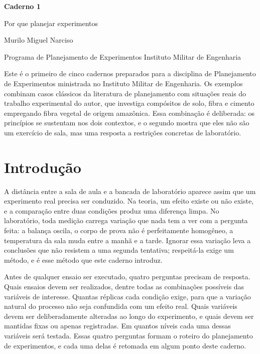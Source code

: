\documentclass{doeapostila}
\begin{document}
\begin{center}
  {\LARGE\bfseries Caderno 1}\par\smallskip
  {\Large Por que planejar experimentos}\par\smallskip
  {\normalsize Murilo Miguel Narciso}\par\smallskip
  {\footnotesize Programa de Planejamento de Experimentos \textbullet{} Instituto Militar de Engenharia}
\end{center}

\vspace{0.6\baselineskip}

\noindent
Este é o primeiro de cinco cadernos preparados para a disciplina de
Planejamento de Experimentos ministrada no Instituto Militar de Engenharia.
Os exemplos combinam casos clássicos da literatura de planejamento com
situações reais do trabalho experimental do autor, que investiga compósitos
de solo, fibra e cimento empregando fibra vegetal de origem amazônica. Essa
combinação é deliberada: os princípios se sustentam nos dois contextos, e o
segundo mostra que eles não são um exercício de sala, mas uma resposta a
restrições concretas de laboratório.

\vspace{0.6\baselineskip}

\tableofcontents

\section{Introdução}
\label{sec:introducao}

A distância entre a sala de aula e a bancada de laboratório aparece assim
que um experimento real precisa ser conduzido. Na teoria, um efeito existe
ou não existe, e a comparação entre duas condições produz uma diferença
limpa. No laboratório, toda medição carrega variação que nada tem a ver com
a pergunta feita: a balança oscila, o corpo de prova não é perfeitamente
homogêneo, a temperatura da sala muda entre a manhã e a tarde. Ignorar essa
variação leva a conclusões que não resistem a uma segunda tentativa;
respeitá-la exige um método, e é esse método que este caderno introduz.

Antes de qualquer ensaio ser executado, quatro perguntas precisam de
resposta. Quais ensaios devem ser realizados, dentre todas as combinações
possíveis das variáveis de interesse. Quantas réplicas cada condição exige,
para que a variação natural do processo não seja confundida com um efeito
real. Quais variáveis devem ser deliberadamente alteradas ao longo do
experimento, e quais devem ser mantidas fixas ou apenas registradas. Em
quantos níveis cada uma dessas variáveis será testada. Essas quatro
perguntas formam o roteiro do planejamento de experimentos, e cada uma delas
é retomada em algum ponto deste caderno.
\end{document}
